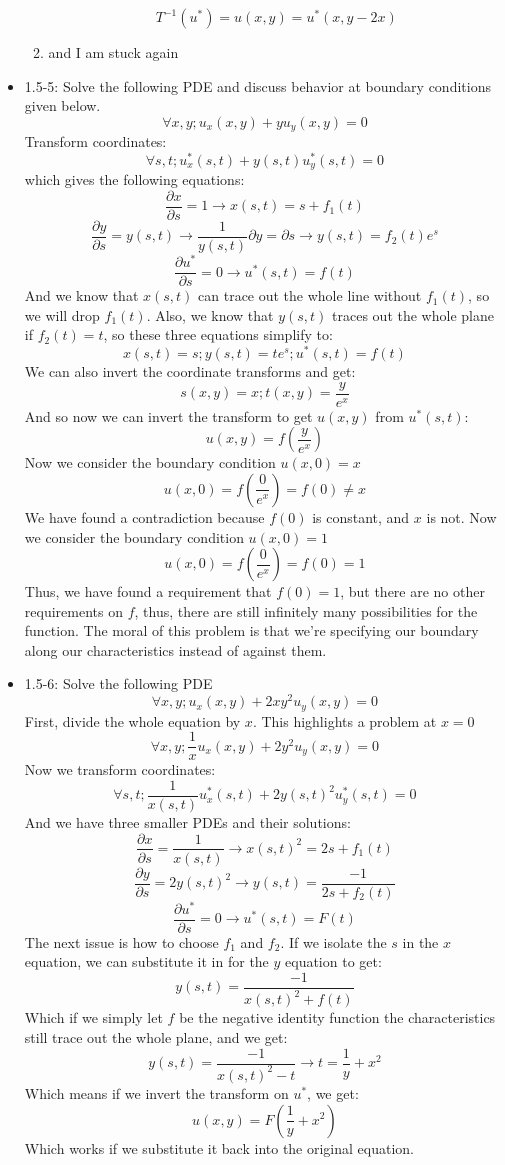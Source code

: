 \documentclass{article}
\begin{document}
\begin{itemize}
\begin{enumerate}
        $$T^{-1}(u^*) = u(x,y) = u^*(x,y - 2x)$$
        \item and I am stuck again
    \end{enumerate}
    \newpage
    \item 1.5-5: Solve the following PDE and discuss behavior at boundary conditions given below.
    $$\forall x,y; u_x(x,y) + yu_y(x,y) = 0$$
    Transform coordinates:
    $$\forall s,t; u_x^*(s,t) + y(s,t)u_y^*(s,t) = 0$$
    which gives the following equations:
    $$\frac{\partial x}{\partial s} = 1 \rightarrow x(s,t) = s + f_1(t)$$
    $$\frac{\partial y}{\partial s} = y(s,t) \rightarrow \frac{1}{y(s,t)}\partial y = \partial s \rightarrow y(s,t) = f_2(t)e^s$$
    $$\frac{\partial u^*}{\partial s} = 0 \rightarrow u^*(s,t) = f(t)$$
    And we know that $x(s,t)$ can trace out the whole line without $f_1(t)$, so we will drop $f_1(t)$.  Also, we know that $y(s,t)$ traces out the whole plane if $f_2(t) = t$, so these three equations simplify to:
    $$x(s,t) = s; y(s,t) = te^s; u^*(s,t)=f(t)$$
    We can also invert the coordinate transforms and get:
    $$s(x,y) = x; t(x,y) = \frac{y}{e^x}$$
    And so now we can invert the transform to get $u(x,y)$ from $u^*(s,t)$:
    $$u(x,y) = f(\frac{y}{e^x})$$
    Now we consider the boundary condition $u(x,0) = x$
    $$u(x,0) = f(\frac{0}{e^x}) = f(0) \neq x$$
    We have found a contradiction because $f(0)$ is constant, and $x$ is not.
    Now we consider the boundary condition $u(x,0) = 1$
    $$u(x,0) = f(\frac{0}{e^x}) = f(0) = 1$$
    Thus, we have found a requirement that $f(0) = 1$, but there are no other requirements on $f$, thus, there are still infinitely many possibilities for the function. The moral of this problem is that we're specifying our boundary along our characteristics instead of against them.
    \newpage
    \item 1.5-6: Solve the following PDE
    $$\forall x,y; u_x(x,y) + 2xy^2u_y(x,y) = 0$$
    First, divide the whole equation by $x$. This highlights a problem at $x = 0$
    $$\forall x,y; \frac{1}{x}u_x(x,y) + 2y^2u_y(x,y) = 0$$
    Now we transform coordinates:
    $$\forall s,t; \frac{1}{x(s,t)}u_x^*(s,t) + 2y(s,t)^2u_y^*(s,t) = 0$$
    And we have three smaller PDEs and their solutions:
    $$\frac{\partial x}{\partial s} = \frac{1}{x(s,t)} \rightarrow x(s,t)^2 = 2s + f_1(t) $$
    $$\frac{\partial y}{\partial s} = 2y(s,t)^2 \rightarrow y(s,t) = \frac{-1}{2s + f_2(t)}$$
    $$\frac{\partial u^*}{\partial s} = 0 \rightarrow u^*(s,t) = F(t)$$
    The next issue is how to choose $f_1$ and $f_2$. If we isolate the $s$ in the $x$ equation, we can substitute it in for the $y$ equation to get:
    $$y(s,t) = \frac{-1}{x(s,t)^2 + f(t)}$$
    Which if we simply let $f$ be the negative identity function the characteristics still trace out the whole plane, and we get:
    $$y(s,t) = \frac{-1}{x(s,t)^2 - t} \rightarrow t = \frac{1}{y}+x^2$$
    Which means if we invert the transform on $u^*$, we get:
    $$u(x,y) = F(\frac{1}{y}+x^2)$$
    Which works if we substitute it back into the original equation.
    
\end{itemize}
\newpage
\end{document}
